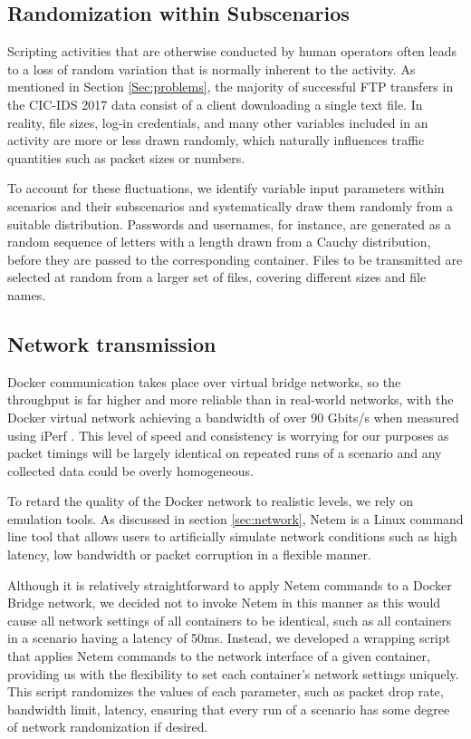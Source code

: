 \subsection{Randomization within Subscenarios}\label{Sec:randomsubscen}

Scripting activities that are otherwise conducted by human operators often leads to a loss of random variation that is normally inherent to the activity.
As mentioned in Section \ref{Sec:problems}, the majority of successful FTP transfers in the CIC-IDS 2017 data consist of a client downloading a single text file. In reality, file sizes, log-in credentials, and many other variables included in an activity are more or less drawn randomly, which naturally influences traffic quantities such as packet sizes or numbers.

To account for these fluctuations, we identify variable input parameters within scenarios and their subscenarios and systematically draw them randomly from a suitable distribution. Passwords and usernames, for instance, are generated as a random sequence of letters with a length drawn from a Cauchy distribution, before they are passed to the corresponding container. Files to be transmitted are selected at random from a larger set of files, covering different sizes and file names.


\subsection{Network transmission}\label{Sec:Netrand}


 Docker communication takes place over virtual bridge networks, so the throughput is far higher and more reliable than in real-world networks, with the Docker virtual network achieving a bandwidth of over 90 Gbits/s when measured using iPerf \cite{iperf}. This level of speed and consistency is worrying for our purposes as packet timings will be largely identical on repeated runs of a scenario and any collected data could be overly homogeneous.

To retard the quality of the Docker network to realistic levels, we rely on emulation tools. As discussed in section \ref{sec:network}, Netem is a Linux command line tool that allows users to artificially simulate network conditions such as high latency, low bandwidth or packet corruption in a flexible manner.

Although it is relatively straightforward to apply Netem commands to a Docker Bridge network, we decided not to invoke Netem in this manner as this would cause all network settings of all containers to be identical, such as all containers in a scenario having a latency of 50ms.  Instead, we developed a wrapping script that applies Netem commands to the network interface of a given container, providing us with the flexibility to set each container's network settings uniquely. This script randomizes the values of each parameter, such as packet drop rate, bandwidth limit, latency, ensuring that every run of a scenario has some degree of network randomization if desired.

